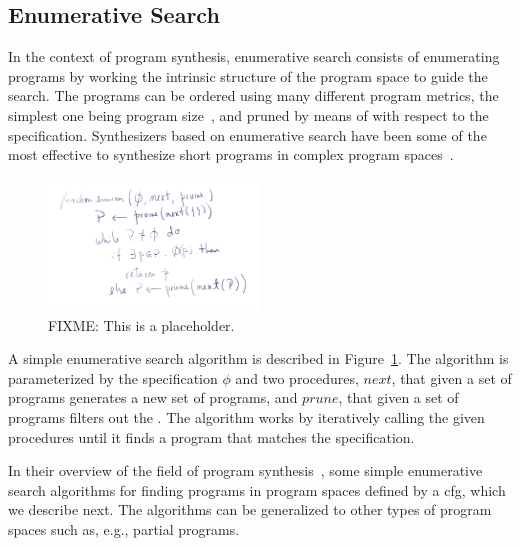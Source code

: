 \subsection{Enumerative Search}
\label{sec:enumerative-search}

In the context of program synthesis, enumerative search consists of
enumerating programs by working the intrinsic structure of the program space to
guide the search. The programs can be ordered using many different program
metrics, the simplest one being program size~\cite{Alur:sygus:2013}, and pruned
by means of  with respect to the
specification. Synthesizers based on enumerative search have been some of the
most effective to synthesize short programs in complex program
spaces~\cite{Gulwani2017}.

\begin{figure}
  \centering
  \includegraphics[width=0.5\textwidth]{assets/enum-01.png}
  \caption{FIXME: This is a placeholder.}
  \label{fig:enum-01}
\end{figure}

A simple enumerative search algorithm is described in Figure~\ref{fig:enum-01}. The
algorithm is parameterized by the specification $\phi{}$ and two procedures,
$next$, that given a set of programs generates a new set of programs, and
$prune$, that given a set of programs filters out the . The algorithm works by iteratively
calling the given procedures until it finds a program that matches the
specification.

In their overview of the field of program synthesis~\cite{Gulwani2017},
\citeauthor{Gulwani2017}  some simple enumerative search algorithms for
finding programs in program spaces defined by a \gls{cfg}, which we describe
next. The algorithms can be generalized to other types of program spaces such
as, e.g., partial programs.


